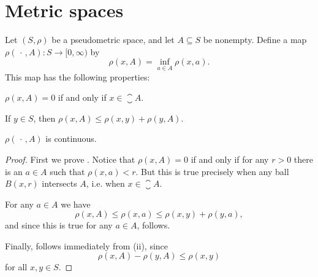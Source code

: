 \documentclass[article, a4paper, 11pt, oneside]{memoir}
\numberwithin{equation}{chapter}
\begin{document}
\section{Metric spaces}

\begin{lemma}
    \label{thm:distance-to-set}
    Let $(S,\rho)$ be a pseudometric space, and let $A \subseteq S$ be nonempty. Define a map $\rho(\,\cdot\,, A) \colon S \to [0, \infty)$ by
    \begin{equation*}
        \rho(x, A) = \inf_{a \in A} \rho(x,a).
    \end{equation*}
    This map has the following properties:
    \begin{enumlem}
        \item \label{enum:distance-to-set-closure} $\rho(x,A) = 0$ if and only if $x \in \closure{A}$.

        \item \label{enum:distance-to-set-triangle-inequality} If $y \in S$, then $\rho(x,A) \leq \rho(x,y) + \rho(y,A)$.

        \item \label{enum:distance-to-set-continuous} $\rho(\,\cdot\,, A)$ is continuous.
    \end{enumlem}
\end{lemma}

\begin{proof}
    First we prove . Notice that $\rho(x,A) = 0$ if and only if for any $r > 0$ there is an $a \in A$ such that $\rho(x,a) < r$. But this is true precisely when any ball $B(x,r)$ intersects $A$, i.e. when $x \in \closure{A}$.

    For any $a \in A$ we have
    \begin{equation*}
        \rho(x,A)
            \leq \rho(x,a)
            \leq \rho(x,y) + \rho(y,a),
    \end{equation*}
    and since this is true for any $a \in A$,  follows.

    Finally,  follows immediately from (ii), since
    \begin{equation*}
        \rho(x,A) - \rho(y,A)
            \leq \rho(x,y)
    \end{equation*}
    for all $x,y \in S$.
\end{proof}
\end{document}
